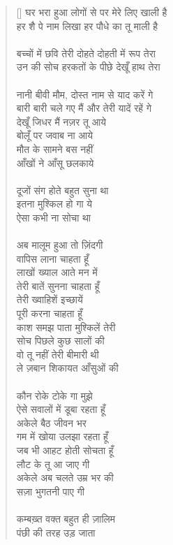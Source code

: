 \begin{verse}[\versewidth]\texthindi{
घर भरा हुआ लोगों से पर मेरे लिए खाली है\\
हर शै पे नाम लिखा हर पौधे का तू माली है\\
\\
बच्चों में छवि तेरी दोहते दोहती में रूप तेरा\\
उन की सोच हरकतों के पीछे देखूँ हाथ तेरा\\
\\
नानी बीवी मौम, दोस्त नाम से याद करें गे\\
बारी बारी चले गए मैं और तेरी यादें रहें गे\\
देखूँ जिधर मैं नज़र तू आये\\
बोलूँ पर जवाब ना आये\\
मौत के सामने बस नहीं\\
आँखों ने आँसू छलकाये\\
\\
दूजों संग होते बहुत सुना था\\
इतना मुश्किल हो गा ये\\
ऐसा कभी ना सोचा था\\
\\
अब मालूम हुआ तो ज़िंदगी\\
वापिस लाना चाहता हूँ\\
लाखों ख्याल आते मन में\\
तेरी बातें सुनना चाहता हूँ\\
तेरी ख्वाहिशें इच्छायें\\
पूरी करना चाहता हूँ\\
काश समझ पाता मुश्किलें तेरी\\
सोच पिछले कुछ सालों की\\
वो तू नहीं तेरी बीमारी थी\\
ले ज़बान शिकायत आँसुओं की\\
\\
कौन रोके टोके गा मुझे\\
ऐसे सवालों में डूबा रहता हूँ\\
अकेले बैठ जीवन भर\\
गम में खोया उलझा रहता हूँ\\
जब भी आहट होती सोचता हूँ\\
लौट के तू आ जाए गी\\
अकेले अब चलते उम्र भर की\\
सज़ा भुगतनी पाए गी\\
\\
कम्बख़्त वक्त बहुत ही ज़ालिम\\
पंछी की तरह उड़ जाता\\
}
\end{verse}
